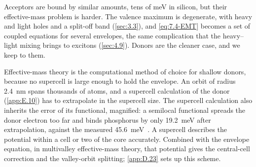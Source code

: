 Acceptors are bound by similar amounts, tens of meV in silicon, but their effective-mass problem is harder. The valence maximum is degenerate, with heavy and light holes and a split-off band (\cref{sec:3.3}), and \cref{eq:7.4-EMT} becomes a set of coupled equations for several envelopes, the same complication that the heavy--light mixing brings to excitons (\cref{sec:4.9}). Donors are the cleaner case, and we keep to them.

Effective-mass theory is the computational method of choice for shallow donors, because no supercell is large enough to hold the envelope. An orbit of radius \SI{2.4}{nm} spans thousands of atoms, and a supercell calculation of the donor (\cref{app:E.10}) has to extrapolate in the supercell size. The supercell calculation also inherits the error of its functional, magnified: a semilocal functional spreads the donor electron too far and binds phosphorus by only \SI{19.2}{meV} after extrapolation, against the measured \SI{45.6}{meV}~\cite[Table~3]{claes2025accurate}. A supercell describes the potential within a cell or two of the core accurately. Combined with the envelope equation, in multivalley effective-mass theory, that potential gives the central-cell correction and the valley-orbit splitting; \cref{app:D.23} sets up this scheme.

